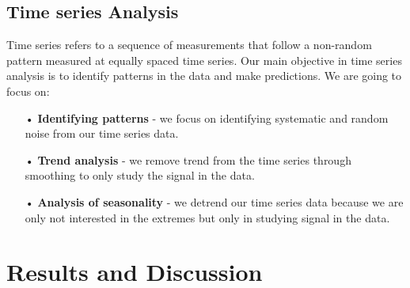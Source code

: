 \documentclass[12pt,a4paper]{article}
\begin{document}
\subsection{Time series Analysis}
Time series refers to a sequence of measurements that follow a non-random pattern measured at equally spaced time series. Our main objective in time series analysis is to identify patterns in the data and make predictions. We are going to focus on:
\begin{enumerate}
\item[•] \textbf{Identifying patterns} - we focus on identifying systematic and random noise from our time series data.
\item[•]\textbf{Trend analysis} - we remove trend from the time series through smoothing to only study the signal in the data.
\item[•]\textbf{Analysis of seasonality} - we detrend our time series data because we are only not interested in the extremes but only in studying signal in the data.
\end{enumerate}
\section{Results and Discussion}
\end{document}
